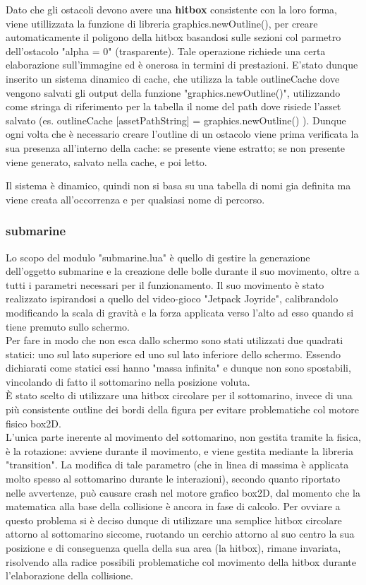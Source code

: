 \documentclass[12pt]{article}
\begin{document}
Dato che gli ostacoli devono avere una \textbf{hitbox} consistente con la loro forma, viene utillizzata la funzione di libreria 
graphics.newOutline(), per creare automaticamente il poligono della hitbox basandosi sulle sezioni col parmetro dell'ostacolo "alpha = 0" (trasparente).
Tale operazione richiede una certa elaborazione sull’immagine ed è onerosa in termini di prestazioni. E'stato dunque inserito un sistema 
dinamico di cache, che utilizza la table outlineCache dove vengono salvati gli output della funzione "graphics.newOutline()", utilizzando come stringa di riferimento per la tabella il nome del path dove risiede l’asset salvato (es. outlineCache [assetPathString] = graphics.newOutline() ).
Dunque ogni volta che è necessario creare l’outline di un ostacolo viene prima verificata la sua presenza all'interno della cache: se presente viene
estratto; se non presente viene generato, salvato nella cache, e poi letto.

Il sistema è dinamico, quindi non si basa 
su una tabella di nomi gia definita ma viene creata all’occorrenza e per qualsiasi nome di percorso.

\subsubsection{submarine}
Lo scopo del modulo "submarine.lua" è quello di gestire la generazione dell'oggetto submarine e la creazione delle bolle durante il suo movimento, oltre a tutti i parametri necessari per il funzionamento.
Il suo movimento è stato realizzato ispirandosi a quello del video-gioco "Jetpack Joyride", calibrandolo modificando la scala di gravità e la forza applicata verso l'alto ad esso quando si tiene premuto sullo schermo.\\

Per fare in modo che non esca dallo schermo sono stati utilizzati due quadrati statici: uno sul lato superiore ed uno sul lato inferiore dello schermo. Essendo dichiarati come statici essi hanno "massa infinita" e dunque non sono spostabili, vincolando di fatto il sottomarino nella posizione voluta.\\

È stato scelto di utilizzare una hitbox circolare per il sottomarino, invece di una più consistente outline dei bordi della figura per evitare problematiche col motore fisico box2D.
\\
L’unica parte inerente al movimento del sottomarino, non gestita tramite la fisica, è la rotazione: avviene durante il movimento, e viene gestita mediante la libreria "transition". La modifica di tale parametro (che in linea di massima è applicata molto spesso al sottomarino durante le interazioni), secondo quanto riportato nelle avvertenze, può causare crash nel motore grafico box2D, dal momento che la matematica alla base della collisione è ancora in fase di calcolo. Per ovviare a questo problema si è deciso dunque di utilizzare una semplice hitbox circolare attorno al sottomarino siccome, ruotando un cerchio attorno al suo centro la sua posizione e di conseguenza quella della sua area (la hitbox), rimane invariata, risolvendo alla radice possibili problematiche col movimento della hitbox durante l’elaborazione della collisione.
\end{document}
